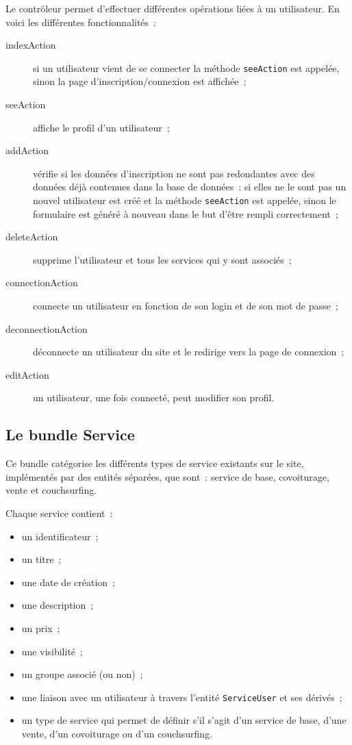 Le contrôleur permet d'effectuer différentes opérations liées à un utilisateur. En voici les différentes fonctionnalités~:
\begin{description}
    \item [indexAction] si un utilisateur vient de se connecter la méthode \verb|seeAction| est appelée, sinon la page d'inscription/connexion est affichée~;
    \item [seeAction] affiche le profil d'un utilisateur~;
    \item [addAction] vérifie si les données d'inscription ne sont pas redondantes avec des données déjà contenues dans la base de données~: si elles ne le sont pas un nouvel utilisateur est créé et la méthode \verb|seeAction| est appelée, sinon le formulaire est généré à nouveau dans le but d'être rempli correctement~;
    \item [deleteAction] supprime l'utilisateur et tous les services qui y sont associés~;
    \item [connectionAction] connecte un utilisateur en fonction de son login et de son mot de passe~;
    \item [deconnectionAction] déconnecte un utilisateur du site et le redirige vers la page de connexion~;
    \item [editAction] un utilisateur, une fois connecté, peut modifier son profil.
\end{description}

\subsection{Le bundle Service}

Ce bundle catégorise les différents types de service existants sur le site, implémentés par des entités séparées, que sont~: service de base, covoiturage, vente et couchsurfing.

Chaque service contient~:
\begin{itemize}
    \item un identificateur~;
    \item un titre~;
    \item une date de création~;
    \item une description~;
    \item un prix~;
    \item une visibilité~;
    \item un groupe associé (ou non)~;
    \item une liaison avec un utilisateur à travers l'entité \verb|ServiceUser| et ses dérivés~;
    \item un type de service qui permet de définir s'il s'agit d'un service de base, d'une vente, d'un covoiturage ou d'un couchsurfing.
\end{itemize}

